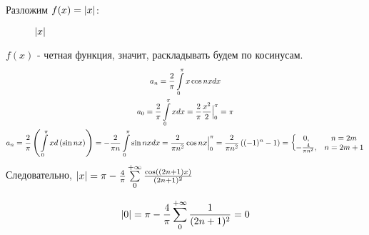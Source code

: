 \newpage

Разложим $f(x) = \left|x\right|$:

\begin{figure}[h]
\centering
{}
	\caption{$\left|x\right|$}	
\end{figure}

$f(x)$ - четная функция, значит, раскладывать будем по косинусам.
\begin{gather*}
	a_n = \frac{2}{\pi} \int\limits_{0}^{\pi} x\cos nx dx \\
	a_0 = \frac{2}{\pi} \int\limits_{0}^{\pi}x dx = \frac{2}{\pi} \frac{x^2}{2}\Big|_{0}^{\pi} = \pi \\
	a_n = \frac{2}{\pi}\left( \int\limits_{0}^{\pi} x d\left(\sin nx \right)\right) = 
	-\frac{2}{\pi n} \int\limits_{0}^{\pi} \sin nx dx = \frac{2}{\pi n^2}\cos nx \Big|_{0}^{\pi} = 
	\frac{2}{\pi n^2}\left((-1)^n - 1\right) = 
	\left\{\begin{matrix}
		0, & n = 2m \\
		-\frac{4}{\pi n^2}, & n = 2m + 1
	\end{matrix}\right.
\end{gather*}
Следовательно, $\left|x\right| = \pi - \frac{4}{\pi}\sum\limits_{0}^{+\infty}\frac{\cos ((2n + 1)x)}{(2n + 1)^2}$


\begin{gather*}
	\left|0\right| = \pi - \frac{4}{\pi} \sum\limits_{0}^{+\infty}\frac{1}{(2n + 1)^2} = 0
\end{gather*}
